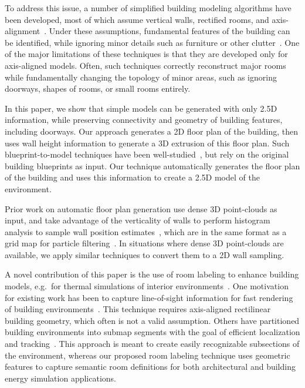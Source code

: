 \documentclass[a4paper,twoside]{article}
\begin{document}
To address this issue, a number of simplified building modeling algorithms have been developed, most of which assume vertical walls, rectified rooms, and axis-alignment~\cite{Museums}.  Under these assumptions, fundamental features of the building can be identified, while ignoring minor details such as furniture or other clutter~\cite{WallFinder}.  One of the major limitations of these techniques is that they are developed only for axis-aligned models.  Often, such techniques correctly reconstruct major rooms while fundamentally changing the topology of minor areas, such as ignoring doorways, shapes of rooms, or small rooms entirely.

In this paper, we show that simple models can be generated with only 2.5D information, while preserving connectivity and geometry of building features, including doorways.  Our approach generates a 2D floor plan of the building, then uses wall height information to generate a 3D extrusion of this floor plan.  Such blueprint-to-model techniques have been well-studied~\cite{Or05,Lewis98}, but rely on the original building blueprints as input.  Our technique automatically generates the floor plan of the building and uses this information to create a 2.5D model of the environment.

Prior work on automatic floor plan generation use dense 3D point-clouds as input, and take advantage of the verticality of walls to perform histogram analysis to sample wall position estimates~\cite{Okorn09,Eigencrust}, which are in the same format as a grid map for particle filtering~\cite{toro05}.  In situations where dense 3D point-clouds are available, we apply similar techniques to convert them to a 2D wall sampling.

A novel contribution of this paper is the use of room labeling to enhance building models, e.g.\ for thermal simulations of interior environments~\cite{EnergyPlus}.  One motivation for existing work has been to capture line-of-sight information for fast rendering of building environments~\cite{WalkthroughRendering}.  This technique requires axis-aligned rectilinear building geometry, which often is not a valid assumption.  Others have partitioned building environments into submap segments with the goal of efficient localization and tracking~\cite{SpectralClustering}.  This approach is meant to create easily recognizable subsections of the environment, whereas our proposed room labeling technique uses geometric features to capture semantic room definitions for both architectural and building energy simulation applications.
\end{document}
